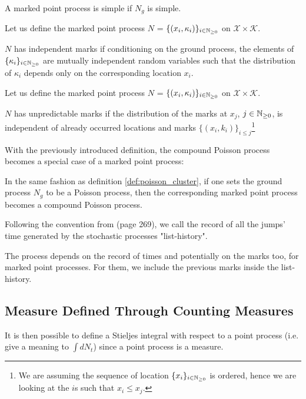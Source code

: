 \documentclass[11pt]{book}
\newcommand{\sequence}[1]{\{ #1 \}_{ i \in \N} }
\begin{document}
\begin{definition}
A marked point process is simple if $N_g$ is simple.
\end{definition}

\vspace{0.2 cm }


\begin{definition}
Let us define the marked point process $N$  = $\sequence{ (x_i, \kappa_i) }$ on $\mathcal X \times \mathcal K$. 

$N$ has independent marks if conditioning on the ground process, the elements of $\sequence{ \kappa_i }$ are mutually independent random variables such that the distribution of $\kappa_i$  depends only on the corresponding location $x_i$. 
\end{definition}


\begin{definition}
Let us define the marked point process $N$  = $\sequence{ (x_i, \kappa_i) }$ on $\mathcal X \times \mathcal K$. 

$N$ has unpredictable marks if the distribution of the marks at $x_j$, $j \in \mathbb{N}_{\geq 0}$, is independent of already occurred locations and marks $\{ (x_i, k_i) \}_{i \leq j}$\footnote{We are assuming the sequence of location $\sequence{x_i}$ is ordered, hence we are looking at the $i$s such that $x_i \leq x_j$.}
\end{definition}


With the previously introduced definition, the compound Poisson process becomes a special case of a marked point process:

\begin{definition}
In the same fashion as definition \ref{def:poisson_cluster}, if one sets the ground process $N_g$ to be a Poisson process, then the corresponding marked point process becomes a compound Poisson process.
\end{definition}



Following the convention from \cite{daley} (page 269), we call the record of all the jumps' time generated by the stochastic processes "list-history". 

The process depends on the record of times and potentially on the marks too, for marked point processes. For them, we include the previous marks inside the list-history.



\subsection{Measure Defined Through Counting Measures}
It is then possible to define a Stieljes integral with respect to a point process (i.e. give a meaning to $\int dN_t$) since a point process is a measure. 
\end{document}
